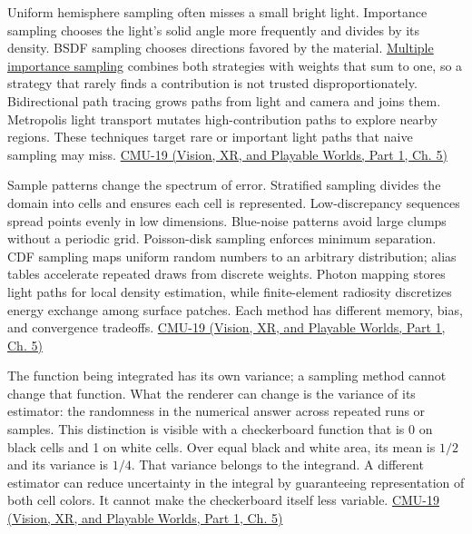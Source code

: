 Uniform hemisphere sampling often misses a small bright light. Importance sampling chooses the light's solid angle more frequently and divides by its density. BSDF sampling chooses directions favored by the material. \hyperref[appendix-031e02bf28af]{Multiple importance sampling} combines both strategies with weights that sum to one, so a strategy that rarely finds a contribution is not trusted disproportionately. Bidirectional path tracing grows paths from light and camera and joins them. Metropolis light transport mutates high-contribution paths to explore nearby regions. These techniques target rare or important light paths that naive sampling may miss. \href{../07-Vision-XR-and-Playable-Worlds-P01/main.pdf\#04-visual-computing-ii-ch036-cmu-19---variance-reduction}{CMU-19 (Vision, XR, and Playable Worlds, Part 1, Ch. 5)}

Sample patterns change the spectrum of error. Stratified sampling divides the domain into cells and ensures each cell is represented. Low-discrepancy sequences spread points evenly in low dimensions. Blue-noise patterns avoid large clumps without a periodic grid. Poisson-disk sampling enforces minimum separation. CDF sampling maps uniform random numbers to an arbitrary distribution; alias tables accelerate repeated draws from discrete weights. Photon mapping stores light paths for local density estimation, while finite-element radiosity discretizes energy exchange among surface patches. Each method has different memory, bias, and convergence tradeoffs. \href{../07-Vision-XR-and-Playable-Worlds-P01/main.pdf\#04-visual-computing-ii-ch036-cmu-19---variance-reduction}{CMU-19 (Vision, XR, and Playable Worlds, Part 1, Ch. 5)}

The function being integrated has its own variance; a sampling method cannot change that function. What the renderer can change is the variance of its estimator: the randomness in the numerical answer across repeated runs or samples. This distinction is visible with a checkerboard function that is 0 on black cells and 1 on white cells. Over equal black and white area, its mean is \(1/2\) and its variance is \(1/4\). That variance belongs to the integrand. A different estimator can reduce uncertainty in the integral by guaranteeing representation of both cell colors. It cannot make the checkerboard itself less variable. \href{../07-Vision-XR-and-Playable-Worlds-P01/main.pdf\#04-visual-computing-ii-ch036-cmu-19---variance-reduction}{CMU-19 (Vision, XR, and Playable Worlds, Part 1, Ch. 5)}

